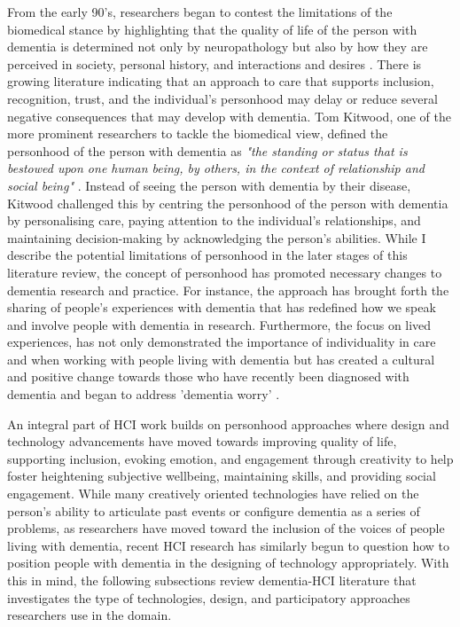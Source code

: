 From the early 90's, researchers began to contest the limitations of the biomedical stance by highlighting that the quality of life of the person with dementia is determined not only by neuropathology but also by how they are perceived in society, personal history, and interactions and desires \citep{o2007personhood}. There is growing literature indicating that an approach to care that supports inclusion, recognition, trust, and the individual's personhood may delay or reduce several negative consequences that may develop with dementia. Tom Kitwood, one of the more prominent researchers to tackle the biomedical view, defined the personhood of the person with dementia as \textit{"the standing or status that is bestowed upon one human being, by others, in the context of relationship and social being"} \citep[pg.8]{kitwood1997dementia}. Instead of seeing the person with dementia by their disease, Kitwood challenged this by centring the personhood of the person with dementia by personalising care, paying attention to the individual's relationships, and maintaining decision-making by acknowledging the person's abilities. While I describe the potential limitations of personhood in the later stages of this literature review, the concept of personhood has promoted necessary changes to dementia research and practice. For instance, the approach has brought forth the sharing of people's experiences with dementia that has redefined how we speak and involve people with dementia in research. Furthermore, the focus on lived experiences, has not only demonstrated the importance of individuality in care and when working with people living with dementia but has created a cultural and positive change towards those who have recently been diagnosed with dementia and began to address 'dementia worry' \citep{kessler_dementia_2012}.

An integral part of HCI work builds on personhood approaches where design and technology advancements have moved towards improving quality of life, supporting inclusion, evoking emotion, and engagement through creativity to help foster heightening subjective wellbeing, maintaining skills, and providing social engagement. While many creatively oriented technologies have relied on the person's ability to articulate past events or configure dementia as a series of problems, as researchers have moved toward the inclusion of the voices of people living with dementia, recent HCI research has similarly begun to question how to position people with dementia in the designing of technology appropriately. With this in mind, the following subsections review dementia-HCI literature that investigates the type of technologies, design, and participatory approaches researchers use in the domain.


